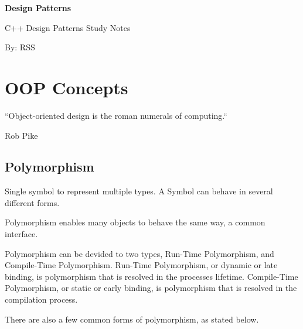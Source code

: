 \documentclass[12pt, a4paper]{book}
\begin{document}
     \begin{center}
         \vspace*{1cm}

         \textbf{\Huge{Design Patterns}}

         \vspace{0.2cm}

          C++ Design Patterns Study Notes

          By: RSS

         \vspace{0.2cm}

     \end{center}

     \newpage{}

  \chapter {OOP Concepts}

   \begin{flushright}
   ``Object-oriented design is the roman numerals of computing.``

   Rob Pike
   \end{flushright}

  \section{Polymorphism}

    Single symbol to represent multiple types. A Symbol can behave in several
    different forms.

    Polymorphism enables many objects to behave the same way, a common interface.

    Polymorphism can be devided to two types, Run-Time Polymorphism,
    and Compile-Time Polymorphism. Run-Time Polymorphism, or dynamic or late
    binding, is polymorphism that is resolved in the processes lifetime. Compile-Time
    Polymorphism, or static or early binding, is polymorphism that
    is resolved in the compilation process.

    There are also a few common forms of polymorphism, as stated below.
\end{document}
